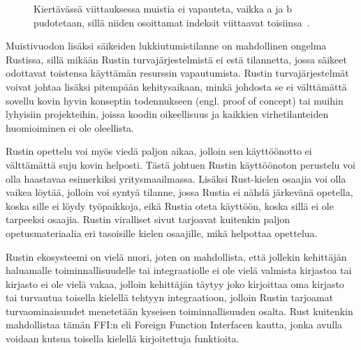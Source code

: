\begin{figure}[H]
  \caption{Kiertävässä viittauksessa muistia ei vapauteta, vaikka a ja b pudotetaan, sillä niiden osoittamat indeksit viittaavat toisiinsa~\cite[chapter~15.6]{rustbook}.}
  \label{cyclic_reference}
\end{figure}

Muistivuodon lisäksi säikeiden lukkiutumistilanne on mahdollinen ongelma Rustissa, sillä mikään Rustin turvajärjestelmistä ei estä tilannetta, jossa säikeet odottavat toistensa käyttämän resurssin vapautumista. Rustin turvajärjestelmät voivat johtaa lisäksi pitempään kehitysaikaan, minkä johdosta se ei välttämättä sovellu kovin hyvin konseptin todennukseen (engl. proof of concept) tai muihin lyhyisiin projekteihin, joissa koodin oikeellisuus ja kaikkien virhetilanteiden huomioiminen ei ole oleellista. 

Rustin opettelu voi myös viedä paljon aikaa, jolloin sen käyttöönotto ei välttämättä suju kovin helposti. Tästä johtuen Rustin käyttöönoton perustelu voi olla haastavaa esimerkiksi yritysmaailmassa. Lisäksi Rust-kielen osaajia voi olla vaikea löytää, jolloin voi syntyä tilanne, jossa Rustia ei nähdä järkevänä opetella, koska sille ei löydy työpaikkoja, eikä Rustia oteta käyttöön, koska sillä ei ole tarpeeksi osaajia. Rustin viralliset sivut tarjoavat kuitenkin paljon opetusmateriaalia eri tasoisille kielen osaajille, mikä helpottaa opettelua.

Rustin ekosysteemi on vielä nuori, joten on mahdollista, että jollekin kehittäjän haluamalle toiminnallisuudelle tai integraatiolle ei ole vielä valmista kirjastoa tai kirjasto ei ole vielä vakaa, jolloin kehittäjän täytyy joko kirjoittaa oma kirjasto tai turvautua toisella kielellä tehtyyn integraatioon, jolloin Rustin tarjoamat turvaominaisuudet menetetään kyseisen toiminnallisuuden osalta. Rust kuitenkin mahdollistaa tämän FFI:n eli Foreign Function Interfacen kautta, jonka avulla voidaan kutsua toisella kielellä kirjoitettuja funktioita.

